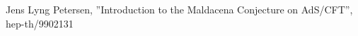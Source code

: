 \begin{thebibliography}{99}  %
Jens Lyng Petersen, ''Introduction to the Maldacena Conjecture on AdS/CFT'', hep-th/9902131
\end{thebibliography}